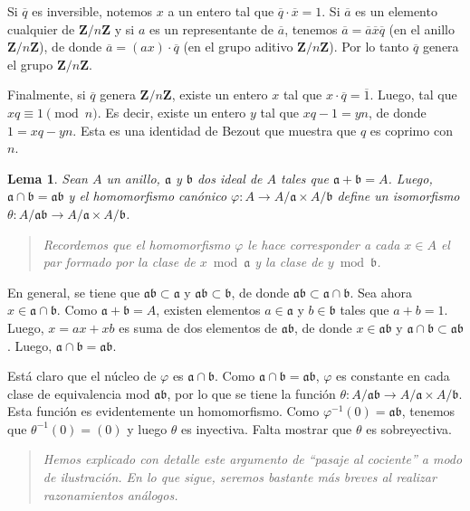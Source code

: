 \documentclass[bibtotoc,leqno,spanish]{amsbook}
\newcommand{\ZZ}{\mathbf{Z}}
\newcommand{\idl}[1]{\mathfrak{#1}}
\newcommand{\oline}[1]{\overline{#1}}
\renewcommand{\to}[1][]{\xrightarrow{#1}}
\numberwithin{equation}{section}
\newenvironment{comm}%
	{\begin{quotation}\itshape}
	{\end{quotation}}
\theoremstyle{note}
\theoremstyle{note}
\newtheorem{lemma}{Lema}
\theoremstyle{rem}
\numberwithin{theorem}{section}
\numberwithin{proposition}{section}
\numberwithin{definition}{section}
\numberwithin{lemma}{section}
\numberwithin{corollary}{section}
\numberwithin{example}{section}
\numberwithin{footnote}{section}%
\begin{document}
Si $\oline q$ es inversible, notemos $x$ a un entero tal que $\oline q\cdot\oline x = 1$.
Si $\oline a$ es un elemento cualquier de $\ZZ/n\ZZ$ y si $a$ es un representante de $\oline a$,
tenemos $\oline a = \oline a\oline x\oline q$ (en el anillo $\ZZ/n\ZZ$), de donde
$\oline a = (ax)\cdot\oline q$ (en el grupo aditivo $\ZZ/n\ZZ$). Por lo tanto $\oline q$
genera el grupo $\ZZ/n\ZZ$.

Finalmente, si $\oline q$ genera $\ZZ/n\ZZ$, existe un entero
$x$ tal que $x\cdot\oline q = \oline 1$. Luego, tal que $xq\equiv 1\pmod n$. Es decir,
existe un entero $y$ tal que $xq-1=yn$, de donde $1 = xq-yn$. Esta es una identidad de Bezout
que muestra que $q$ es coprimo con $n$.

\begin{lemma}\label{lem1.3.1}
Sean $A$ un anillo, $\idl{a}$ y $\idl{b}$ dos ideal de $A$ tales que $\idl{a}+\idl{b}=A$.
Luego, $\idl{a}\cap\idl{b} = \idl{a}\idl{b}$ y el homomorfismo can\'onico
$\varphi:A\to A/\idl{a}\times A/\idl{b}$ define un isomorfismo $\theta:A/\idl{a}\idl{b}\to A/\idl{a}\times
A/\idl{b}$.
\end{lemma}

\begin{comm}
Recordemos que el homomorfismo $\varphi$ le hace corresponder a cada $x\in A$ el par formado
por la clase de $x\bmod\idl{a}$ y la clase de $y\bmod\idl{b}$.
\end{comm}

En general, se tiene que $\idl{a}\idl{b}\subset\idl{a}$ y $\idl{a}\idl{b}\subset\idl{b}$, de
donde $\idl{a}\idl{b}\subset\idl{a}\cap\idl{b}$. Sea ahora $x\in\idl{a}\cap\idl{b}$.
Como $\idl{a}+\idl{b}=A$, existen elementos $a\in\idl{a}$ y $b\in\idl{b}$ tales
que $a+b=1$. Luego, $x = ax+xb$ es suma de dos elementos de $\idl{a}\idl{b}$, de donde
$x\in\idl{a}\idl{b}$ y $\idl{a}\cap\idl{b}\subset\idl{a}\idl{b}$. Luego,
$\idl{a}\cap\idl{b} = \idl{a}\idl{b}$.

Est\'a claro que el n\'ucleo de $\varphi$ es $\idl{a}\cap\idl{b}$. Como $\idl{a}\cap\idl{b}
=\idl{a}\idl{b}$, $\varphi$ es constante en cada clase de equivalencia mod $\idl{a}\idl{b}$,
por lo que se tiene la funci\'on $\theta : A/\idl{a}\idl{b}\to A/\idl{a}\times A/\idl{b}$.
Esta funci\'on es evidentemente un homomorfismo. Como $\varphi^{-1}(0) = \idl{a}\idl{b}$,
tenemos que $\theta^{-1}(0) = (0)$ y luego $\theta$ es inyectiva. Falta mostrar que $\theta$
es sobreyectiva.

\begin{comm}
Hemos explicado con detalle este argumento de ``pasaje al cociente'' a modo de ilustraci\'on.
En lo que sigue, seremos bastante m\'as breves al realizar razonamientos an\'alogos.
\end{comm}
\end{document}
